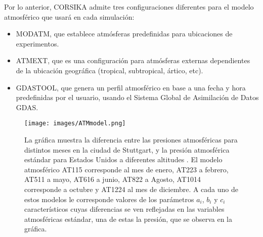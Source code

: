 Por lo anterior, CORSIKA admite tres configuraciones diferentes para el modelo atmosférico que usará en cada simulación:
\begin{itemize}
    \item MODATM, que establece atmósferas predefinidas para ubicaciones de experimentos.
    \item ATMEXT, que es una configuración para atmósferas externas dependientes de la ubicación geográfica (tropical, subtropical, ártico, etc).
    \item GDASTOOL, que genera un perfil atmosférico en base a una fecha y hora predefinidas por el usuario, usando el Sistema Global de Asimilación de Datos GDAS.
\end{itemize}{}

\begin{figure}[htb!]
\centering
\texttt{[image: images/ATMmodel.png]}
\caption[Presión atmosférica vs la altura para Estados Unidos y Stuttgart.]{La gráfica muestra la diferencia entre las presiones atmosféricas para distintos meses en la ciudad de Stuttgart, y la presión atmosférica estándar para Estados Unidos a diferentes altitudes \cite{Heck1998}. El modelo atmosférico AT115 corresponde al mes de enero, AT223 a febrero, AT511 a mayo, AT616 a junio, AT822 a Agosto, AT1014 corresponde a octubre y AT1224 al mes de diciembre. A cada uno de estos modelos le corresponde valores de los parámetros $a_{i}$, $b_{i}$ y $c_{i}$ característicos cuyas diferencias se ven reflejadas en las variables atmosféricas estándar, una de estas la presión, que se observa en la gráfica.}
 \label{fig:fig6}
\end{figure}






